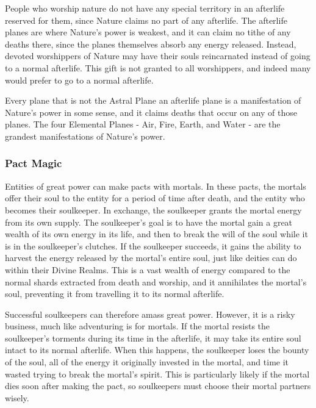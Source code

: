            People who worship nature do not have any special territory in an afterlife reserved for them, since Nature claims no part of any afterlife.
            The afterlife planes are where Nature's power is weakest, and it can claim no tithe of any deaths there, since the planes themselves absorb any energy released.
            Instead, devoted worshippers of Nature may have their souls reincarnated instead of going to a normal afterlife.
            This gift is not granted to all worshippers, and indeed many would prefer to go to a normal afterlife.

            Every plane that is not the Astral Plane an afterlife plane is a manifestation of Nature's power in some sense, and it claims deaths that occur on any of those planes.
            The four Elemental Planes - Air, Fire, Earth, and Water - are the grandest manifestations of Nature's power.

        \subsubsection{Pact Magic}
            Entities of great power can make pacts with mortals.
            In these pacts, the mortals offer their soul to the entity for a period of time after death, and the entity who becomes their soulkeeper.
            In exchange, the soulkeeper grants the mortal energy from its own supply.
            The soulkeeper's goal is to have the mortal gain a great wealth of its own energy in its life, and then to break the will of the soul while it is in the soulkeeper's clutches.
            If the soulkeeper succeeds, it gains the ability to harvest the energy released by the mortal's entire soul, just like deities can do within their Divine Realms.
            This is a vast wealth of energy compared to the normal shards extracted from death and worship, and it annihilates the mortal's soul, preventing it from travelling it to its normal afterlife.

            Successful soulkeepers can therefore amass great power.
            However, it is a risky business, much like adventuring is for mortals.
            If the mortal resists the soulkeeper's torments during its time in the afterlife, it may take its entire soul intact to its normal afterlife.
            When this happens, the soulkeeper loses the bounty of the soul, all of the energy it originally invested in the mortal, and time it wasted trying to break the mortal's spirit.
            This is particularly likely if the mortal dies soon after making the pact, so soulkeepers must choose their mortal partners wisely.

